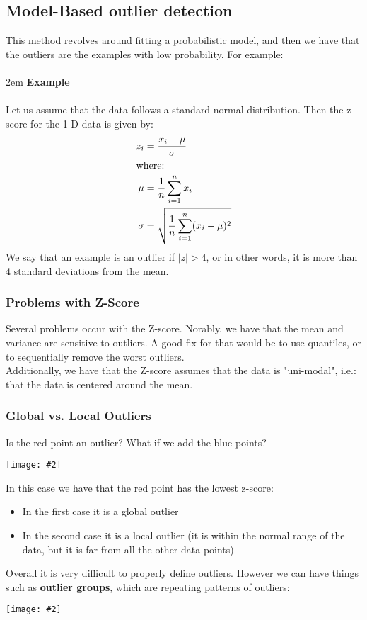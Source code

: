 \documentclass{article}
\def\blu#1{{\color{blu}#1}}
\def\gre#1{{\color{gre}#1}}
\def\red#1{{\color{red}#1}}
\theoremstyle{definition}
\newcommand{\centerfig}[2]{\begin{center}\texttt{[image: \#2]}\end{center}}
\begin{document}
\subsection*{Model-Based outlier detection}
This method revolves around fitting a probabilistic model, and then we have that the outliers are the examples with low probability. For example:\\\\

\begingroup
\leftskip 2em
\noindent \textbf{Example}\\ \\
Let us assume that the data follows a standard normal distribution. Then the \blu{z-score} for the 1-D data is given by:
\begin{align*}
z_i &= \frac{x_i - \mu}{\sigma} \\
\intertext{where:}
\mu &= \frac{1}{n} \sum_{i = 1}^{n}x_i \\
\sigma &= \sqrt{\frac{1}{n} \sum_{i = 1}^{n}(x_i-\mu)^2}
\end{align*}
We say that an example is an outlier if $ |z| > 4 $, or in other words, it is more than 4 standard deviations from the mean. 

\endgroup

\subsubsection*{Problems with Z-Score}
Several problems occur with the Z-score. Norably, we have that \red{the mean and variance are sensitive to outliers}. A good fix for that would be to use quantiles, or to sequentially remove the worst outliers. \\
Additionally, we have that the Z-score assumes that the data is "uni-modal", i.e.: that the data is centered around the mean. 

\subsubsection*{Global vs. Local Outliers}
Is the \red{red point} an outlier? What if we add the \blu{blue points}?
\centerfig{0.5}{Pic15}
In this case we have that the \red{red point} has the lowest z-score:
\begin{itemize}
	\item In the first case it is a global outlier
	\item In the second case it is a local outlier (it is within the normal range of the data, but it is far from all the other data points)
\end{itemize}
Overall it is very difficult to properly define outliers. However we can have things such as \gre{\textbf{outlier groups}}, which are repeating patterns of outliers:
\centerfig{0.8}{Pic16}
\end{document}
